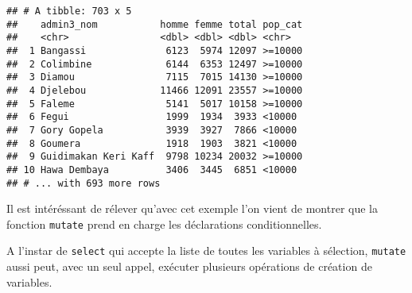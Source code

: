 \documentclass[]{book}
\newenvironment{Shaded}{\begin{snugshade}}{\end{snugshade}}
\newcommand{\KeywordTok}[1]{\textcolor[rgb]{0.13,0.29,0.53}{\textbf{#1}}}
\newcommand{\DataTypeTok}[1]{\textcolor[rgb]{0.13,0.29,0.53}{#1}}
\newcommand{\DecValTok}[1]{\textcolor[rgb]{0.00,0.00,0.81}{#1}}
\newcommand{\StringTok}[1]{\textcolor[rgb]{0.31,0.60,0.02}{#1}}
\newcommand{\CommentTok}[1]{\textcolor[rgb]{0.56,0.35,0.01}{\textit{#1}}}
\newcommand{\OperatorTok}[1]{\textcolor[rgb]{0.81,0.36,0.00}{\textbf{#1}}}
\newcommand{\NormalTok}[1]{#1}
\begin{document}
\begin{Shaded}
\end{Shaded}

\begin{verbatim}
## # A tibble: 703 x 5
##    admin3_nom           homme femme total pop_cat
##    <chr>                <dbl> <dbl> <dbl> <chr>  
##  1 Bangassi              6123  5974 12097 >=10000
##  2 Colimbine             6144  6353 12497 >=10000
##  3 Diamou                7115  7015 14130 >=10000
##  4 Djelebou             11466 12091 23557 >=10000
##  5 Faleme                5141  5017 10158 >=10000
##  6 Fegui                 1999  1934  3933 <10000 
##  7 Gory Gopela           3939  3927  7866 <10000 
##  8 Goumera               1918  1903  3821 <10000 
##  9 Guidimakan Keri Kaff  9798 10234 20032 >=10000
## 10 Hawa Dembaya          3406  3445  6851 <10000 
## # ... with 693 more rows
\end{verbatim}

Il est intéréssant de rélever qu'avec cet exemple l'on vient de montrer
que la fonction \texttt{mutate} prend en charge les déclarations
conditionnelles.

A l'instar de \texttt{select} qui accepte la liste de toutes les
variables à sélection, \texttt{mutate} aussi peut, avec un seul appel,
exécuter plusieurs opérations de création de variables.

\begin{Shaded}
\end{Shaded}
\end{document}
